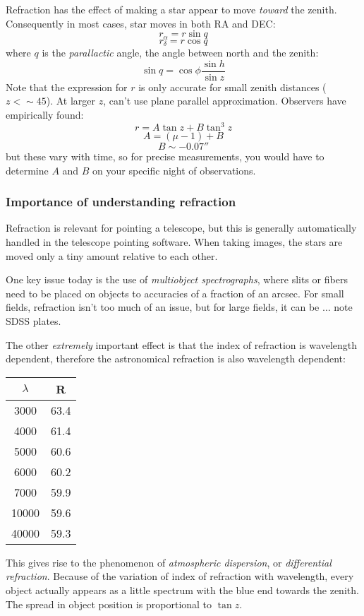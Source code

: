 \documentclass[12pt]{article}
\begin{document}
Refraction has the effect of making a star appear to move \emph{toward} the
zenith. Consequently in most cases, star moves in both RA and DEC:
\[
    r_{\alpha} = r\sin{q}
    \]
\[
    r_{\delta} = r\cos{q}
    \]
where $q$ is the \textit{parallactic} angle, the angle between north and
the zenith:
\[
    \sin{q} = \cos\phi\frac{\sin{h}}{\sin{z}}
    \]
Note that the expression for $r$ is only accurate for small zenith
distances ($z < \sim 45$). At larger $z$, can't use plane parallel
approximation. Observers have empirically found:
\[
    r = A\tan{z} + B\tan^{3}z
    \]
\[
    A = (\mu - 1) + B
    \]
\[
    B \sim -0.07''
    \]
but these vary with time, so for precise measurements, you would have
to determine $A$ and $B$ on your specific night of observations.

\subsubsection{Importance of understanding refraction}
Refraction is relevant for pointing a telescope, but this is generally
automatically handled in the telescope pointing software. When taking
images, the stars are moved only a tiny amount relative to each other.

One key issue today is the use of \textit{multiobject spectrographs}, where slits or
fibers need to be placed on objects to accuracies of a fraction of an arcsec.
For small fields, refraction isn't too much of an issue, but for large fields,
it can be $\ldots$ note SDSS plates.

The other \emph{extremely} important effect is that the
index of refraction is wavelength dependent, therefore the astronomical
refraction is also wavelength dependent:
\begin{center}
    \begin{tabular}{c c}
        \hline\hline
        $\lambda$ & R\\
        \hline
        3000 & 63.4\\
        4000 & 61.4\\
        5000 & 60.6\\
        6000 & 60.2\\
        7000 & 59.9\\
        10000 & 59.6\\
        40000 & 59.3\\
        \hline
    \end{tabular}
\end{center}
This gives rise to the phenomenon of \textit{atmospheric dispersion}, or
\textit{differential refraction}. Because of the variation of index of
refraction with wavelength, every object actually appears as a little spectrum
with the blue end towards the zenith. The spread in object position is
proportional to $\tan{z}$.
\end{document}
